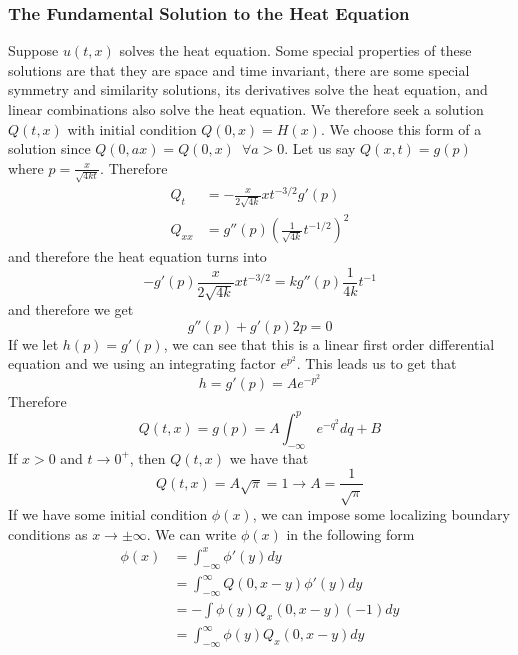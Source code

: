 \documentclass{article}
\newcommand{\push}{\,\,\,}
\theoremstyle{definition}
\begin{document}
\subsubsection{The Fundamental Solution to the Heat Equation}
Suppose $u(t,x)$ solves the heat equation. Some special properties of these solutions are that they are space and time invariant, there are some special symmetry and similarity solutions, its derivatives solve the heat equation, and linear combinations also solve the heat equation. We therefore seek a solution $Q(t,x)$ with initial condition $Q(0,x)=H(x)$. We choose this form of a solution since $Q(0,ax)=Q(0,x)\push \forall a>0$. Let us say $Q(x,t)=g(p) $ where $p=\frac{x}{\sqrt{4kt}}$. Therefore 
\begin{equation*}
    \begin{split}
        Q_t &=-\frac{x}{2\sqrt{4k}}xt^{-3/2}g'(p) \\
        Q_{xx}&= g''(p)\left(\frac{1}{\sqrt{4k}}t^{-1/2}\right)^2
    \end{split}
\end{equation*}
and therefore the heat equation turns into 
\begin{equation*}
    -g'(p)\frac{x}{2\sqrt{4k}}xt^{-3/2} = kg''(p)\frac{1}{4k}t^{-1}
\end{equation*}
and therefore we get 
\begin{equation*}
    g''(p)+g'(p)2p=0
\end{equation*}
If we let $h(p)=g'(p)$, we can see that this is a linear first order differential equation and we using an integrating factor $e^{p^2}$. This leads us to get that 
\begin{equation*}
    h=g'(p)=Ae^{-p^2}
\end{equation*}
Therefore 
\begin{equation*}
    Q(t,x)=g(p)=A\int^p_{-\infty} e^{-q^2}dq+B
\end{equation*}
If $x>0$ and $t\rightarrow 0^+$, then $Q(t,x)$ we have that 
\begin{equation*}
    Q(t,x)=A\sqrt{\pi}=1 \to A=\frac{1}{\sqrt\pi}
\end{equation*}
If we have some initial condition $\phi (x)$, we can impose some localizing boundary conditions as $x\to \pm \infty$. We can write $\phi(x)$ in the following form 
\begin{equation*}
    \begin{split}
        \phi(x)&=\int^x_{-\infty}\phi'(y)dy \\&= \int^\infty_{-\infty}Q(0,x-y) \phi '(y)dy \\
        &= - \int\phi(y)Q_x(0,x-y) (-1)dy \\
        &=\int^\infty_{-\infty}\phi (y)Q_x(0,x-y)dy
    \end{split}
\end{equation*}
\end{document}

